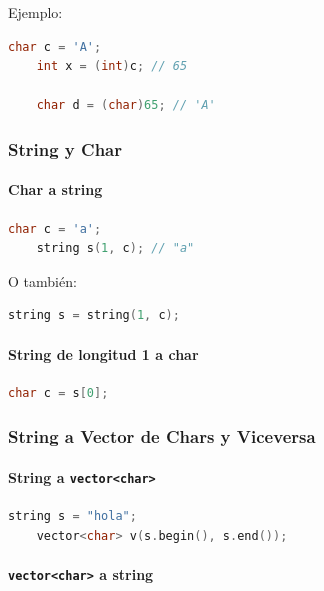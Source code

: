 Ejemplo:
\begin{lstlisting}[language=C++]
	char c = 'A';
	int x = (int)c; // 65

	char d = (char)65; // 'A'
\end{lstlisting}

\subsubsection{String y Char}

\paragraph{Char a string}

\begin{lstlisting}[language=C++]
	char c = 'a';
	string s(1, c); // "a"
\end{lstlisting}

O también:

\begin{lstlisting}[language=C++]
	string s = string(1, c);
\end{lstlisting}

\paragraph{String de longitud 1 a char}

\begin{lstlisting}[language=C++]
	char c = s[0];
\end{lstlisting}

\subsubsection{String a Vector de Chars y Viceversa}

\paragraph{String a \texttt{vector<char>}}

\begin{lstlisting}[language=C++]
	string s = "hola";
	vector<char> v(s.begin(), s.end());
\end{lstlisting}

\paragraph{\texttt{vector<char>} a string}

